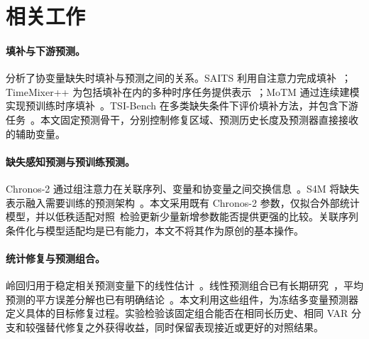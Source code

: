 \section{相关工作}
\label{sec:related}

\paragraph{填补与下游预测。}
\citet{lemorvan2021good} 分析了协变量缺失时填补与预测之间的关系。SAITS 利用自注意力完成填补~\citep{du2023saits}；TimeMixer++ 为包括填补在内的多种时序任务提供表示~\citep{wang2025timemixerpp}；MoTM 通过连续建模实现预训练时序填补~\citep{motmsoftware}。TSI-Bench 在多类缺失条件下评价填补方法，并包含下游任务~\citep{du2024tsibench}。本文固定预测骨干，分别控制修复区域、预测历史长度及预测器直接接收的辅助变量。

\paragraph{缺失感知预测与预训练预测。}
Chronos-2 通过组注意力在关联序列、变量和协变量之间交换信息~\citep{ansari2025chronos2}。S4M 将缺失表示融入需要训练的预测架构~\citep{peng2025s4m}。本文采用既有 Chronos-2 参数，仅拟合外部统计模型，并以低秩适配对照~\citep{hu2021lora}检验更新少量新增参数能否提供更强的比较。关联序列条件化与模型适配均是已有能力，本文不将其作为原创的基本操作。

\paragraph{统计修复与预测组合。}
岭回归用于稳定相关预测变量下的线性估计~\citep{hoerl1970ridge}。线性预测组合已有长期研究~\citep{bates1969combination}，平均预测的平方误差分解也已有明确结论~\citep{krogh1994ensembles}。本文利用这些组件，为冻结多变量预测器定义具体的目标修复过程。实验检验该固定组合能否在相同长历史、相同 VAR 分支和较强替代修复之外获得收益，同时保留表现接近或更好的对照结果。
